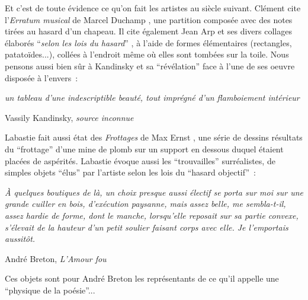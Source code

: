 \documentclass{article}
\newenvironment{citationbox}
{\begin{center}
		\begin{minipage}{.8\textwidth}
		}
		{
		\end{minipage}	
\end{center}
}
\begin{document}
			Et c'est de toute évidence ce qu'on fait les artistes au siècle suivant. Clément cite l'\textit{Erratum musical} de Marcel Duchamp \cite{duchamp1915}, une partition composée avec des notes tirées au hasard d'un chapeau. Il cite également Jean Arp et ses divers collages élaborés ``\textit{selon les lois du hasard}'' \cite{arp1916}, à l'aide de formes élémentaires (rectangles, patatoïdes...), collées à l'endroit même où elles sont tombées sur la toile. Nous pensons aussi bien sûr à Kandinsky et sa ``révélation'' face à l'une de ses oeuvre disposée à l'envers~:
			\begin{citationbox}
				\textit{un tableau d'une indescriptible beauté, tout imprégné d'un flamboiement intérieur}\\
				\begin{flushright}
					Vassily Kandinsky, \textit{source inconnue}
				\end{flushright}
			\end{citationbox}
			Labastie fait aussi état des \textit{Frottages} de Max Ernst \cite{ernst1926}, une série de dessins résultats du ``frottage'' d'une mine de plomb sur un support en dessous duquel étaient placées de aspérités. Labastie évoque aussi les ``trouvailles'' surréalistes, de simples objets ``élus'' par l'artiste selon les lois du ``hasard objectif''~:
			\begin{citationbox}
				\textit{À quelques boutiques de là, un choix presque aussi électif se porta sur moi sur une grande cuiller en bois, d'exécution paysanne, mais assez belle, me sembla-t-il, assez hardie de forme, dont le manche, lorsqu'elle reposait sur sa partie convexe, s'élevait de la hauteur d'un petit soulier faisant corps avec elle. Je l'emportais aussitôt.}\\
				\begin{flushright}
					André Breton, \textit{L'Amour fou}\cite{breton1937}
				\end{flushright}
			\end{citationbox}
			Ces objets sont pour André Breton les représentants de ce qu'il appelle une ``physique de la poésie''...\\
			
\end{document}
